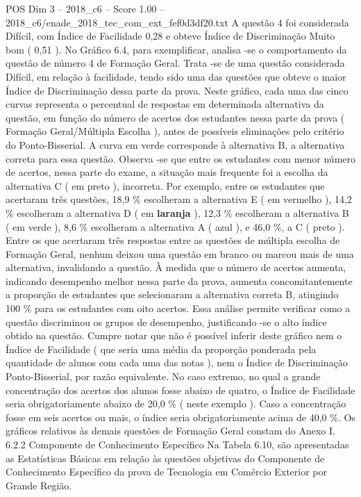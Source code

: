 \begin{textsample}{POS Dim 3 – 2018\_c6 – Score 1.00 – 2018\_c6/enade\_2018\_tec\_com\_ext\_fef0d3df20.txt}
A questão 4 foi considerada Difícil, com Índice de Facilidade 0,28 e obteve Índice de Discriminação Muito bom ( 0,51 ).
No Gráfico 6.4, para exemplificar, analisa -se o comportamento da questão de número 4 de Formação Geral.
Trata -se de uma questão considerada Difícil, em relação à facilidade, tendo sido uma das questões que obteve o maior Índice de Discriminação dessa parte da prova.
Neste gráfico, cada uma das cinco curvas representa o percentual de respostas em determinada alternativa da questão, em função do número de acertos dos estudantes nessa parte da prova ( Formação Geral/Múltipla Escolha ), antes de possíveis eliminações pelo critério do Ponto-Bisserial.
A curva em verde corresponde à alternativa B, a alternativa correta para essa questão.
Observa -se que entre os estudantes com menor número de acertos, nessa parte do exame, a situação mais frequente foi a escolha da alternativa C ( em preto ), incorreta.
Por exemplo, entre os estudantes que acertaram três questões, 18,9 \% escolheram a alternativa E ( em vermelho ), 14,2 \% escolheram a alternativa D ( em \textbf{laranja} ), 12,3 \% escolheram a alternativa B ( em verde ), 8,6 \% escolheram a alternativa A ( azul ), e 46,0 \%, a C ( preto ).
Entre os que acertaram três respostas entre as questões de múltipla escolha de Formação Geral, nenhum deixou uma questão em branco ou marcou mais de uma alternativa, invalidando a questão.
À medida que o número de acertos aumenta, indicando desempenho melhor nessa parte da prova, aumenta concomitantemente a proporção de estudantes que selecionaram a alternativa correta B, atingindo 100 \% para os estudantes com oito acertos.
Essa análise permite verificar como a questão discriminou os grupos de desempenho, justificando -se o alto índice obtido na questão.
Cumpre notar que não é possível inferir deste gráfico nem o Índice de Facilidade ( que seria uma média da proporção ponderada pela quantidade de alunos com cada uma das notas ), nem o Índice de Discriminação Ponto-Bisserial, por razão equivalente.
No caso extremo, no qual a grande concentração dos acertos dos alunos fosse abaixo de quatro, o Índice de Facilidade seria obrigatoriamente abaixo de 20,0 \% ( neste exemplo ).
Caso a concentração fosse em seis acertos ou mais, o índice seria obrigatoriamente acima de 40,0 \%.
Os gráficos relativos às demais questões de Formação Geral constam do Anexo I. 6.2.2 Componente de Conhecimento Específico Na Tabela 6.10, são apresentadas as Estatísticas Básicas em relação às questões objetivas do Componente de Conhecimento Específico da prova de Tecnologia em Comércio Exterior por Grande Região.

\end{textsample}
